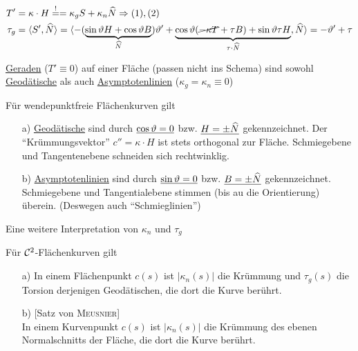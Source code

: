 \begin{beweis}
 \begin{align*}
  T' &= \kappa \cdot H \stackrel{!}{=} = \kappa_g S + \kappa_n \widehat N \Rightarrow (1), (2) \\
  \tau_g &= \langle S', \widehat N \rangle = \langle -(\underbrace{\sin \vartheta H + \cos \vartheta B}_{\widehat N}) \vartheta' + \underbrace{\cos \vartheta (\cancel{-\kappa T} + \tau B) + \sin \vartheta \tau H}_{\tau \cdot \widehat N}, \widehat N \rangle = -\vartheta' + \tau
 \end{align*}
\end{beweis}

\begin{bemerkung}
 \uline{Geraden} (\(T' \equiv 0\)) auf einer Fläche (passen nicht ins Schema) sind sowohl \uline{Geodätische} als auch \uline{Asymptotenlinien} (\(\kappa_g = \kappa_n \equiv 0\))
\end{bemerkung}

\begin{folgerung}
 Für wendepunktfreie Flächenkurven gilt
 \begin{enumerate}
  \item[a)] \uline{Geodätische} sind durch \(\uline{\cos \vartheta = 0}\) bzw. \(\uline{H = \pm \widehat N}\) gekennzeichnet. Der "`Krümmungsvektor"' \(c'' = \kappa \cdot H\) ist stets orthogonal zur Fläche. Schmiegebene und Tangentenebene schneiden sich rechtwinklig.
  \item[b)] \uline{Asymptotenlinien} sind durch \(\uline{\sin \vartheta = 0}\) bzw. \(\uline{B = \pm \widehat N}\) gekennzeichnet. Schmiegebene und Tangentialebene stimmen (bis au die Orientierung) überein. (Deswegen auch "`Schmieglinien"')
 \end{enumerate}
\end{folgerung}

Eine weitere Interpretation von \(\kappa_n\) und \(\tau_g\)

\begin{satz}\label{satz244}
 Für \(\mathcal{C}^2\)-Flächenkurven gilt
 \begin{enumerate}
  \item[a)] In einem Flächenpunkt \(c(s)\) ist \(|\kappa_n(s)|\) die Krümmung und \(\tau_g(s)\) die Torsion derjenigen Geodätischen, die dort die Kurve berührt.
  \item[b)] [Satz von \textsc{Meusnier}] \\
  In einem Kurvenpunkt \(c(s)\) ist \(|\kappa_n(s)|\) die Krümmung des ebenen Normalschnitts der Fläche, die dort die Kurve berührt.
 \end{enumerate}
\end{satz}

